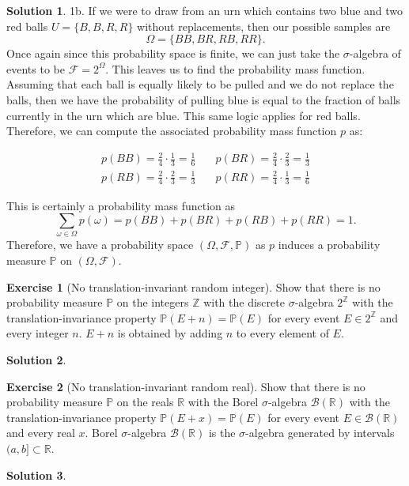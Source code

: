 \documentclass[12pt]{article}
\newcommand{\Prob}{\mathbb{P}}
\newcommand{\calF}{\mathcal{F}}
\theoremstyle{definition}
\newtheorem{exer}{Exercise}
\newtheorem{sol}{Solution}
\theoremstyle{remark}
\begin{document}
\begin{sol}
1b. If we were to draw from an urn which contains two blue and two red balls $U = \{B, B, R, R\}$ without replacements, then our possible samples are 
\begin{equation}
    \Omega = \{BB, BR, RB, RR\}.
\end{equation}
Once again since this probability space is finite, we can just take the $\sigma$-algebra of events to be $\calF = 2^\Omega$. This leaves us to find the probability mass function. Assuming that each ball is equally likely to be pulled and we do not replace the balls, then we have the probability of pulling blue is equal to the fraction of balls currently in the urn which are blue. This same logic applies for red balls. Therefore, we can compute the associated probability mass function $p$ as: 

\begin{align}
    p(BB) = \frac{2}{4} \cdot \frac{1}{3} = \frac{1}{6} &\quad p(BR) = \frac{2}{4}\cdot \frac{2}{3} = \frac{1}{3} \\
    p(RB) = \frac{2}{4} \cdot \frac{2}{3} = \frac{1}{3} &\quad p(RR) = \frac{2}{4}\cdot \frac{1}{3} = \frac{1}{6} 
\end{align}

This is certainly a probability mass function as 
\begin{equation}
    \sum_{\omega\in\Omega}p(\omega) = p(BB) + p(BR) + p(RB) + p(RR) = 1.
\end{equation} Therefore, we have a probability space $(\Omega, \calF, \Prob)$ as $p$ induces a probability measure $\Prob$ on $(\Omega, \calF)$.
\end{sol}

\newpage
\begin{exer}[No translation-invariant random integer]
Show that there is no probability measure $\Prob$ on the integers $\mathbb{Z}$ with the discrete
$\sigma$-algebra $2^{\mathbb{Z}}$ with the translation-invariance property $\Prob(E + n) = \Prob(E)$ for every event $E \in 2^{\mathbb{Z}}$ and every integer $n$. $E+n$ is obtained by adding $n$ to every element of $E$.
\end{exer}
\begin{sol}

\end{sol}

\newpage
\begin{exer}[No translation-invariant random real]
 Show that there is no probability measure $\Prob$ on the reals $\mathbb{R}$ with the Borel
$\sigma$-algebra $\mathcal{B}(\mathbb{R})$ with the translation-invariance property $\Prob(E + x) = \Prob(E)$ for every event $E \in \mathcal{B}(\mathbb{R})$ and every real $x$. Borel $\sigma$-algebra $\mathcal{B}(\mathbb{R})$ is the $\sigma$-algebra generated by intervals $(a,b] \subset \mathbb{R}$.
\end{exer}
\begin{sol}

\end{sol}
\end{document}
